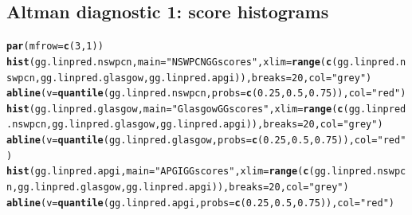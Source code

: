\documentclass{article}\usepackage[]{graphicx}\usepackage[]{color}
\makeatletter
\newcommand{\hlnum}[1]{\textcolor[rgb]{0.686,0.059,0.569}{#1}}%
\newcommand{\hlstr}[1]{\textcolor[rgb]{0.192,0.494,0.8}{#1}}%
\newcommand{\hlstd}[1]{\textcolor[rgb]{0.345,0.345,0.345}{#1}}%
\newcommand{\hlkwc}[1]{\textcolor[rgb]{0.333,0.667,0.333}{#1}}%
\newcommand{\hlkwd}[1]{\textcolor[rgb]{0.737,0.353,0.396}{\textbf{#1}}}%
\newenvironment{kframe}{%
 \def\at@end@of@kframe{}%
 \ifinner\ifhmode%
  \def\at@end@of@kframe{\end{minipage}}%
  \begin{minipage}{\columnwidth}%
 \fi\fi%
 \def\FrameCommand##1{\hskip\@totalleftmargin \hskip-\fboxsep
 \colorbox{shadecolor}{##1}\hskip-\fboxsep
     \hskip-\linewidth \hskip-\@totalleftmargin \hskip\columnwidth}%
 \MakeFramed {\advance\hsize-\width
   \@totalleftmargin\z@ \linewidth\hsize
   \@setminipage}}%
 {\par\unskip\endMakeFramed%
 \at@end@of@kframe}
\newenvironment{knitrout}{}{} %
\makeatother
\begin{document}
\subsection{Altman diagnostic 1: score histograms}
\begin{knitrout}
\color{fgcolor}\begin{kframe}
\begin{alltt}
\hlkwd{par}\hlstd{(}\hlkwc{mfrow} \hlstd{=} \hlkwd{c}\hlstd{(}\hlnum{3}\hlstd{,} \hlnum{1}\hlstd{))}
\hlkwd{hist}\hlstd{(gg.linpred.nswpcn,} \hlkwc{main} \hlstd{=} \hlstr{"NSWPCN GG scores"}\hlstd{,} \hlkwc{xlim} \hlstd{=} \hlkwd{range}\hlstd{(}\hlkwd{c}\hlstd{(gg.linpred.nswpcn, gg.linpred.glasgow, gg.linpred.apgi)),} \hlkwc{breaks} \hlstd{=} \hlnum{20}\hlstd{,} \hlkwc{col} \hlstd{=} \hlstr{"grey"}\hlstd{)}
\hlkwd{abline}\hlstd{(}\hlkwc{v} \hlstd{=} \hlkwd{quantile}\hlstd{(gg.linpred.nswpcn,} \hlkwc{probs} \hlstd{=} \hlkwd{c}\hlstd{(}\hlnum{0.25}\hlstd{,} \hlnum{0.5}\hlstd{,} \hlnum{0.75}\hlstd{)),} \hlkwc{col} \hlstd{=} \hlstr{"red"}\hlstd{)}
\hlkwd{hist}\hlstd{(gg.linpred.glasgow,} \hlkwc{main} \hlstd{=} \hlstr{"Glasgow GG scores"}\hlstd{,} \hlkwc{xlim} \hlstd{=} \hlkwd{range}\hlstd{(}\hlkwd{c}\hlstd{(gg.linpred.nswpcn, gg.linpred.glasgow, gg.linpred.apgi)),} \hlkwc{breaks} \hlstd{=} \hlnum{20}\hlstd{,} \hlkwc{col} \hlstd{=} \hlstr{"grey"}\hlstd{)}
\hlkwd{abline}\hlstd{(}\hlkwc{v} \hlstd{=} \hlkwd{quantile}\hlstd{(gg.linpred.glasgow,} \hlkwc{probs} \hlstd{=} \hlkwd{c}\hlstd{(}\hlnum{0.25}\hlstd{,} \hlnum{0.5}\hlstd{,} \hlnum{0.75}\hlstd{)),} \hlkwc{col} \hlstd{=} \hlstr{"red"}\hlstd{)}
\hlkwd{hist}\hlstd{(gg.linpred.apgi,} \hlkwc{main} \hlstd{=} \hlstr{"APGI GG scores"}\hlstd{,} \hlkwc{xlim} \hlstd{=} \hlkwd{range}\hlstd{(}\hlkwd{c}\hlstd{(gg.linpred.nswpcn, gg.linpred.glasgow, gg.linpred.apgi)),} \hlkwc{breaks} \hlstd{=} \hlnum{20}\hlstd{,} \hlkwc{col} \hlstd{=} \hlstr{"grey"}\hlstd{)}
\hlkwd{abline}\hlstd{(}\hlkwc{v} \hlstd{=} \hlkwd{quantile}\hlstd{(gg.linpred.apgi,} \hlkwc{probs} \hlstd{=} \hlkwd{c}\hlstd{(}\hlnum{0.25}\hlstd{,} \hlnum{0.5}\hlstd{,} \hlnum{0.75}\hlstd{)),} \hlkwc{col} \hlstd{=} \hlstr{"red"}\hlstd{)}
\end{alltt}
\end{kframe}


\end{knitrout}
\end{document}
